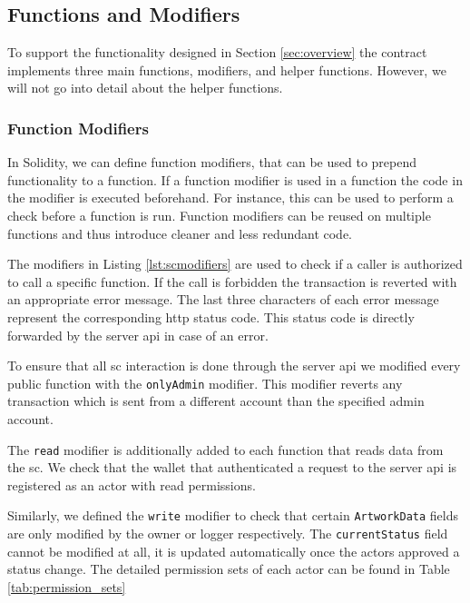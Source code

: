 

\subsection{Functions and Modifiers}
To support the functionality designed in Section \ref{sec:overview} the contract implements three main functions, modifiers, and helper functions. However, we will not go into detail about the helper functions.

\subsubsection{Function Modifiers}
In Solidity, we can define function modifiers, that can be used to prepend functionality to a function. If a function modifier is used in a function the code in the modifier is executed beforehand. For instance, this can be used to perform a check before a function is run. Function modifiers can be reused on multiple functions and thus introduce cleaner and less redundant code.



The modifiers in Listing \ref{lst:scmodifiers} are used to check if a caller is authorized to call a specific function. If the call is forbidden the transaction is reverted with an appropriate error message. The last three characters of each error message represent the corresponding \gls{http} status code. This status code is directly forwarded by the server \gls{api} in case of an error.

To ensure that all \gls{sc} interaction is done through the server \gls{api} we modified every public function with the \texttt{onlyAdmin} modifier. This modifier reverts any transaction which is sent from a different account than the specified admin account.

The \texttt{read} modifier is additionally added to each function that reads data from the \gls{sc}. We check that the wallet that authenticated a request to the server \gls{api} is registered as an actor with read permissions.

Similarly, we defined the \texttt{write} modifier to check that certain \texttt{ArtworkData} fields are only modified by the owner or logger respectively. The \texttt{currentStatus} field cannot be modified at all, it is updated automatically once the actors approved a status change. The detailed permission sets of each actor can be found in Table \ref{tab:permission_sets}

